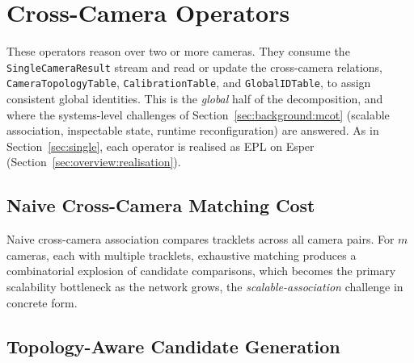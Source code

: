 \documentclass[review]{elsarticle}
\begin{document}
\section{Cross-Camera Operators}
\label{sec:multi}

These operators reason over two or more cameras. They consume the \texttt{SingleCameraResult} stream and read or update the cross-camera relations, \texttt{CameraTopologyTable}, \texttt{CalibrationTable}, and \texttt{GlobalIDTable}, to assign consistent global identities. This is the \emph{global} half of the decomposition, and where the systems-level challenges of Section~\ref{sec:background:mcot} (scalable association, inspectable state, runtime reconfiguration) are answered. As in Section~\ref{sec:single}, each operator is realised as EPL on Esper (Section~\ref{sec:overview:realisation}).

\subsection{Naive Cross-Camera Matching Cost}
\label{sec:multi:naive}
Naive cross-camera association compares tracklets across all camera pairs. For $m$ cameras, each with multiple tracklets, exhaustive matching produces a combinatorial explosion of candidate comparisons, which becomes the primary scalability bottleneck as the network grows, the \emph{scalable-association} challenge in concrete form.

\subsection{Topology-Aware Candidate Generation}
\label{sec:multi:assoc}
\end{document}
